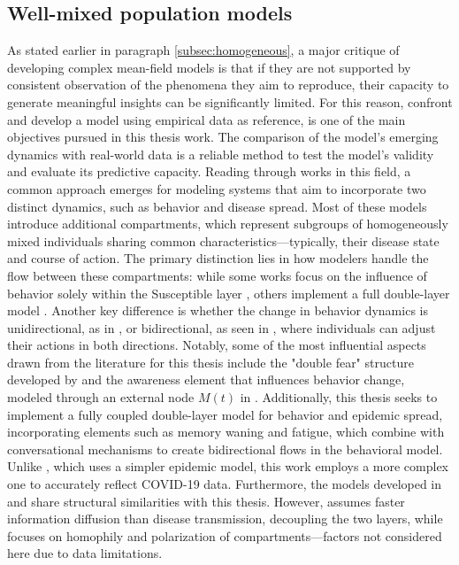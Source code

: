 \subsection{Well-mixed population models}
As stated earlier in paragraph \ref{subsec:homogeneous}, a major critique of developing complex mean-field models is that if they are not supported by consistent observation of the phenomena they aim to reproduce, their capacity to generate meaningful insights can be significantly limited. For this reason, confront and develop a model using empirical data as reference, is one of the main objectives pursued in this thesis work. The comparison of the model's emerging dynamics with real-world data is a reliable method to test the model's validity and evaluate its predictive capacity.
Reading through works in this field, a common approach emerges for modeling systems that aim to incorporate two distinct dynamics, such as behavior and disease spread. Most of these models introduce additional compartments, which represent subgroups of homogeneously mixed individuals sharing common characteristics—typically, their disease state and course of action. The primary distinction lies in how modelers handle the flow between these compartments: while some works focus on the influence of behavior solely within the Susceptible layer \cite{Epstein_2021, Tyson_2020, Zuo2022}, others implement a full double-layer model \cite{Bongarti2023, Bulai2023, Tanaka_2002}. Another key difference is whether the change in behavior dynamics is unidirectional, as in \cite{Bongarti2023}, or bidirectional, as seen in \cite{Epstein_2021, Tyson_2020, Tanaka_2002, Zuo2022}, where individuals can adjust their actions in both directions.
Notably, some of the most influential aspects drawn from the literature for this thesis include the "double fear" structure developed by \cite{Epstein_2021} and the awareness element that influences behavior change, modeled through an external node $M(t)$ in \cite{Zuo2022}. Additionally, this thesis seeks to implement a fully coupled double-layer model for behavior and epidemic spread, incorporating elements such as memory waning and fatigue, which combine with conversational mechanisms to create bidirectional flows in the behavioral model.
Unlike \cite{Tanaka_2002}, which uses a simpler epidemic model, this work employs a more complex one to accurately reflect COVID-19 data. Furthermore, the models developed in \cite{Bulai2023} and \cite{Smaldino_2021} share structural similarities with this thesis. However, \cite{Bulai2023} assumes faster information diffusion than disease transmission, decoupling the two layers, while \cite{Smaldino_2021} focuses on homophily and polarization of compartments—factors not considered here due to data limitations.

